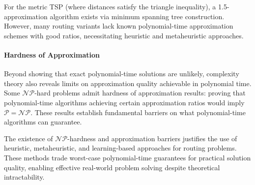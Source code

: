 For the metric TSP (where distances satisfy the triangle inequality), a 1.5-approximation algorithm exists via minimum spanning tree construction. However, many routing variants lack known polynomial-time approximation schemes with good ratios, necessitating heuristic and metaheuristic approaches.

\paragraph{Hardness of Approximation}

Beyond showing that exact polynomial-time solutions are unlikely, complexity theory also reveals limits on approximation quality achievable in polynomial time. Some $\mathcal{NP}$-hard problems admit hardness of approximation results: proving that polynomial-time algorithms achieving certain approximation ratios would imply $\mathcal{P} = \mathcal{NP}$. These results establish fundamental barriers on what polynomial-time algorithms can guarantee.

The existence of $\mathcal{NP}$-hardness and approximation barriers justifies the use of heuristic, metaheuristic, and learning-based approaches for routing problems. These methods trade worst-case polynomial-time guarantees for practical solution quality, enabling effective real-world problem solving despite theoretical intractability.
